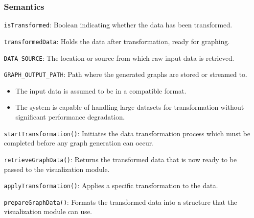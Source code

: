 \documentclass[12pt, titlepage]{article}
\begin{document}
\begin{description}
\subsubsection{Semantics}
\begin{description}
  \item[State Variables:]
  \item \texttt{isTransformed}: Boolean indicating whether the data has been transformed.
  \item \texttt{transformedData}: Holds the data after transformation, ready for graphing.
  \item
  \item[Environment Variables:]
  \item \texttt{DATA\_SOURCE}: The location or source from which raw input data is retrieved.
  \item \texttt{GRAPH\_OUTPUT\_PATH}: Path where the generated graphs are stored or streamed to.
  \item 

  \item[Assumptions:]
  \item
  \begin{itemize}
    \item The input data is assumed to be in a compatible format.
  \end{itemize}
  \item 
  \begin{itemize}
    \item The system is capable of handling large datasets for transformation without significant 
    performance degradation.
  \end{itemize}
  \item 

  \item[Access Routine Semantics:] 
  \item \texttt{startTransformation()}: Initiates the data transformation process which must be completed before 
  any graph generation can occur.
  \item \texttt{retrieveGraphData()}: Returns the transformed data that is now ready to be passed to the visualization 
  module.
  \item
  \item[Local Function:] 
  \item \texttt{applyTransformation()}: Applies a specific transformation to the data.
  \item \texttt{prepareGraphData()}: Formats the transformed data into a structure that the visualization module can use.
\end{description}


\end{description}
\end{document}

